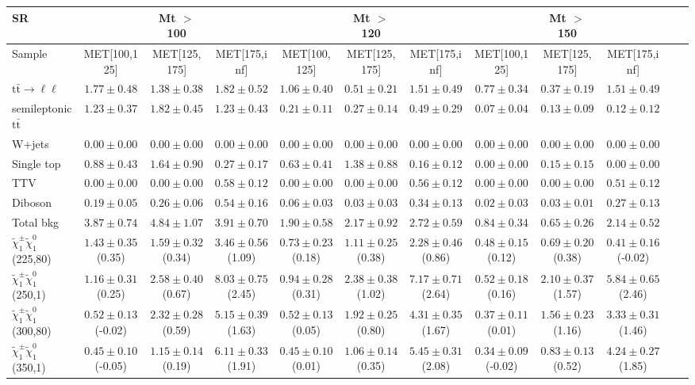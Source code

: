 \begin{table}
\begin{center}
\small
\begin{tabular}{lccccccccccc}
\hline
SR & & Mt $>$ 100 & & & Mt $>$ 120 & & &Mt $>$ 150 & & &\\
\hline
Sample&MET[100,125]&MET[125,175]&MET[175,inf]&MET[100,125]&MET[125,175]&MET[175,inf]&MET[100,125]&MET[125,175]&MET[175,inf]&\\
\hline
$\mathrm{t}\bar{\mathrm{t}}\rightarrow \ell\ell$&$1.77\pm0.48$&$1.38\pm0.38$&$1.82\pm0.52$&$1.06\pm0.40$&$0.51\pm0.21$&$1.51\pm0.49$&$0.77\pm0.34$&$0.37\pm0.19$&$1.51\pm0.49$\\
semileptonic $\mathrm{t}\bar{\mathrm{t}}$&$1.23\pm0.37$&$1.82\pm0.45$&$1.23\pm0.43$&$0.21\pm0.11$&$0.27\pm0.14$&$0.49\pm0.29$&$0.07\pm0.04$&$0.13\pm0.09$&$0.12\pm0.12$\\
W+jets&$0.00\pm0.00$&$0.00\pm0.00$&$0.00\pm0.00$&$0.00\pm0.00$&$0.00\pm0.00$&$0.00\pm0.00$&$0.00\pm0.00$&$0.00\pm0.00$&$0.00\pm0.00$\\
Single top&$0.88\pm0.43$&$1.64\pm0.90$&$0.27\pm0.17$&$0.63\pm0.41$&$1.38\pm0.88$&$0.16\pm0.12$&$0.00\pm0.00$&$0.15\pm0.15$&$0.00\pm0.00$\\
TTV&$0.00\pm0.00$&$0.00\pm0.00$&$0.58\pm0.12$&$0.00\pm0.00$&$0.00\pm0.00$&$0.56\pm0.12$&$0.00\pm0.00$&$0.00\pm0.00$&$0.51\pm0.12$\\
Diboson&$0.19\pm0.05$&$0.26\pm0.06$&$0.54\pm0.16$&$0.06\pm0.03$&$0.03\pm0.03$&$0.34\pm0.13$&$0.02\pm0.03$&$0.03\pm0.01$&$0.27\pm0.13$\\
\hline
Total bkg&$3.87\pm0.74$&$4.84\pm1.07$&$3.91\pm0.70$&$1.90\pm0.58$&$2.17\pm0.92$&$2.72\pm0.59$&$0.84\pm0.34$&$0.65\pm0.26$&$2.14\pm0.52$\\
$\tilde{\chi}_{1}^{\pm}\tilde{\chi}_{1}^{0}$ (225,80)&$1.43\pm0.35$(0.35)&$1.59\pm0.32$(0.34)&$3.46\pm0.56$(1.09)&$0.73\pm0.23$(0.18)&$1.11\pm0.25$(0.38)&$2.28\pm0.46$(0.86)&$0.48\pm0.15$(0.12)&$0.69\pm0.20$(0.38)&$0.41\pm0.16$(-0.02)\\
$\tilde{\chi}_{1}^{\pm}\tilde{\chi}_{1}^{0}$ (250,1)&$1.16\pm0.31$(0.25)&$2.58\pm0.40$(0.67)&$8.03\pm0.75$(2.45)&$0.94\pm0.28$(0.31)&$2.38\pm0.38$(1.02)&$7.17\pm0.71$(2.64)&$0.52\pm0.18$(0.16)&$2.10\pm0.37$(1.57)&$5.84\pm0.65$(2.46)\\
$\tilde{\chi}_{1}^{\pm}\tilde{\chi}_{1}^{0}$ (300,80)&$0.52\pm0.13$(-0.02)&$2.32\pm0.28$(0.59)&$5.15\pm0.39$(1.63)&$0.52\pm0.13$(0.05)&$1.92\pm0.25$(0.80)&$4.31\pm0.35$(1.67)&$0.37\pm0.11$(0.01)&$1.56\pm0.23$(1.16)&$3.33\pm0.31$(1.46)\\
$\tilde{\chi}_{1}^{\pm}\tilde{\chi}_{1}^{0}$ (350,1)&$0.45\pm0.10$(-0.05)&$1.15\pm0.14$(0.19)&$6.11\pm0.33$(1.91)&$0.45\pm0.10$(0.01)&$1.06\pm0.14$(0.35)&$5.45\pm0.31$(2.08)&$0.34\pm0.09$(-0.02)&$0.83\pm0.13$(0.52)&$4.24\pm0.27$(1.85)\\
\hline
\hline\hline
\end{tabular}
\end{center}
\end{table}
